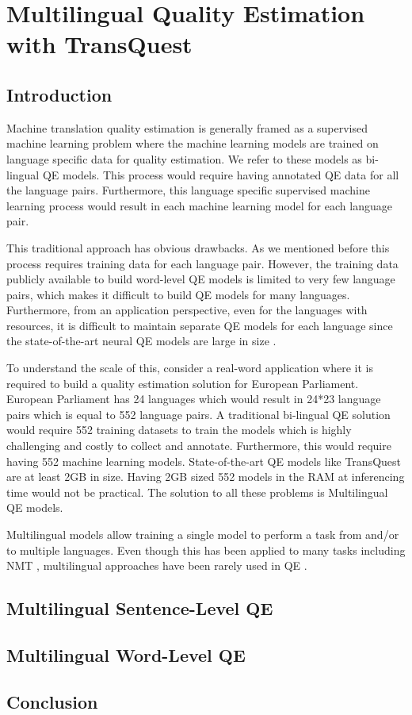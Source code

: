 \chapter{\label{cha:multilingual}Multilingual Quality Estimation with TransQuest}

\section{Introduction}
Machine translation quality estimation is generally framed as a supervised machine learning problem \cite{kepler-etal-2019-openkiwi,lee-2020-two} where the machine learning models are trained on language specific data for quality estimation. We refer to these models as bi-lingual QE models. This process would require having annotated QE data for all the language pairs. Furthermore, this language specific supervised machine learning process would result in each machine learning model for each language pair. 

This traditional approach has obvious drawbacks. As we mentioned before this process requires training data for each language pair. However, the training data publicly available to build word-level QE models is limited to very few language pairs, which makes it difficult to build QE models for many languages. Furthermore, from an application perspective, even for the languages with resources, it is difficult to maintain separate QE models for each language 
since the state-of-the-art neural QE models are large in size \cite{ranasinghe-etal-2020-transquest}. 

To understand the scale of this, consider a real-word application where it is required to build a quality estimation solution for European Parliament. European Parliament has 24 languages which would result in 24*23 language pairs which is equal to 552 language pairs. A traditional bi-lingual QE solution would require 552 training datasets to train the models which is highly challenging and costly to collect and annotate. Furthermore, this would require having 552 machine learning models. State-of-the-art QE models like TransQuest are at least 2GB in size. Having 2GB sized 552 models in the RAM at inferencing time would not be practical. The solution to all these problems is Multilingual QE models. 

Multilingual models allow training a single model to perform a task from and/or to multiple languages. Even though this has been applied to many tasks \cite{ranasinghe-zampieri-2020-multilingual,ranasinghe-zampieri-2021-mudes} including NMT \cite{nguyen-chiang-2017-transfer, aharoni-etal-2019-massively}, multilingual approaches have been rarely used in QE \cite{sun-etal-2020-exploratory}.

 

\section{Multilingual Sentence-Level QE}


\section{Multilingual Word-Level QE}

\section{Conclusion}